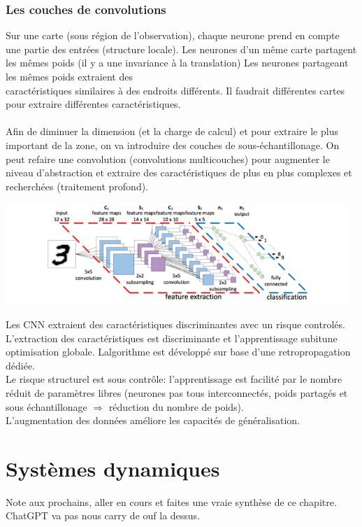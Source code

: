 \documentclass[a4paper,12pt,oneside]{report}	%
\begin{document}
        \subsection*{Les couches de convolutions}
            Sur une carte (sous région de l'observation), chaque neurone prend en compte une partie des entrées (structure locale). Les neurones d'un même carte partagent les mêmes poids (il y a une invariance à la translation) \colorbox{bright-blue}{Les neurones partageant les mêmes poids extraient des}\\ \colorbox{bright-blue}{caractéristiques similaires à des endroits différents.} Il faudrait différentes cartes pour extraire différentes caractéristiques.\\\\
            Afin de diminuer la dimension (et la charge de calcul) et pour extraire le plus important de la zone, on va introduire des couches de sous-échantillonage.
            \newpage
            On peut refaire une convolution (convolutions multicouches) pour augmenter le niveau d'abstraction et extraire des caractéristiques de plus en plus complexes et recherchées (traitement profond).
            \begin{center}
                \includegraphics[width=13cm]{LaTeX/pictures/3.6_1.png}
            \end{center}
            Les CNN extraient des caractéristiques discriminantes avec un risque controlés. L'extraction des caractéristiques est discriminante et l'apprentissage subitune optimisation globale. Lalgorithme est développé sur base d'une retropropagation dédiée.\\
            Le risque structurel est sous contrôle: l'apprentissage est facilité par le nombre réduit de paramètres libres (neurones pas tous interconnectés, poids partagés et sous échantillonage $\Rightarrow$ réduction du nombre de poids).\\
            \colorbox{bright-blue}{L'augmentation des données améliore les capacités de généralisation.}
            
\chapter{Systèmes dynamiques}
    \colorbox{bright-red}{Note aux prochains}, aller en cours et faites une vraie synthèse de ce chapitre. ChatGPT va pas nous carry de ouf la dessus.
\end{document}
